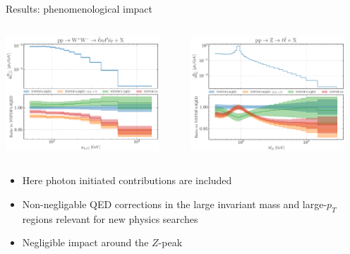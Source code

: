 \documentclass[aspectratio=169, 9pt,t]{beamer}
\begin{document}
\begin{frame}{Results: phenomenological impact}
  \begin{columns}[T]
    \begin{column}{0.49\textwidth}
      \includegraphics[width=0.9\textwidth]{figures/NNPDF_WPWM_14TEV_40_PHENO-internal.pdf}
    \end{column}
    \begin{column}{0.49\textwidth}
      \includegraphics[width=0.9\textwidth]{figures/NNPDF_DY_14TEV_40_PHENO-internal.pdf}
    \end{column}
  \end{columns}

  \vspace*{1em}
  \begin{itemize}
    \item Here photon initiated contributions are included
    \item Non-negligable QED corrections in the large invariant mass and large-$p_T$ regions relevant for new physics searches
    \item Negligible impact around the $Z$-peak
  \end{itemize}
\end{frame}
\end{document}
